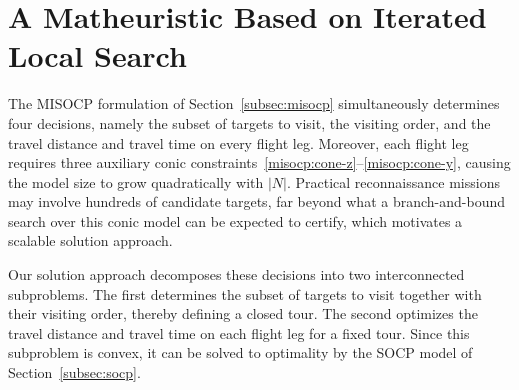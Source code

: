 %
\section{A Matheuristic Based on Iterated Local Search}\label{sec:heuristic}

The MISOCP formulation of Section~\ref{subsec:misocp} simultaneously determines four decisions, namely the subset of targets to visit, the visiting order, and the travel distance and travel time on every flight leg. Moreover, each flight leg requires three auxiliary conic constraints~\eqref{misocp:cone-z}--\eqref{misocp:cone-y}, causing the model size to grow quadratically with $|N|$. Practical reconnaissance missions may involve hundreds of candidate targets, far beyond what a branch-and-bound search over this conic model can be expected to certify, which motivates a scalable solution approach.

Our solution approach decomposes these decisions into two interconnected subproblems. The first determines the subset of targets to visit together with their visiting order, thereby defining a closed tour. The second optimizes the travel distance and travel time on each flight leg for a fixed tour. Since this subproblem is convex, it can be solved to optimality by the SOCP model of Section~\ref{subsec:socp}.

